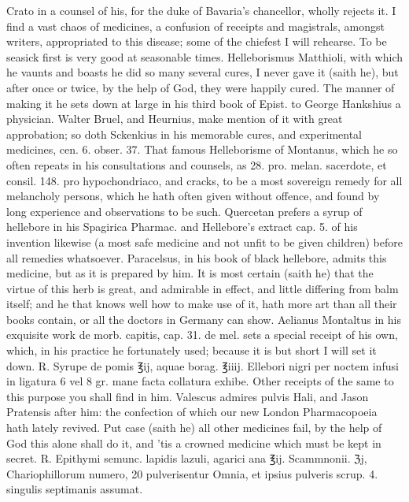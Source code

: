Crato in a counsel of his, for the duke of Bavaria's chancellor, wholly
rejects it.
I find a vast chaos of medicines, a confusion of receipts and
magistrals, amongst writers, appropriated to this disease; some of the
chiefest I will rehearse. To be seasick first is very good at
seasonable times. Helleborismus Matthioli, with which he vaunts and
boasts he did so many several cures, I never gave it (saith he),
but after once or twice, by the help of God, they were happily cured.
The manner of making it he sets down at large in his third book of
Epist. to George Hankshius a physician. Walter Bruel, and Heurnius,
make mention of it with great approbation; so doth Sckenkius in his
memorable cures, and experimental medicines, cen. 6. obser. 37. That
famous Helleborisme of Montanus, which he so often repeats in his
consultations and counsels, as 28. pro. melan. sacerdote, et consil.
148. pro hypochondriaco, and cracks,  to be a most sovereign
remedy for all melancholy persons, which he hath often given without
offence, and found by long experience and observations to be such.
Quercetan prefers a syrup of hellebore in his Spagirica Pharmac. and
Hellebore's extract cap. 5. of his invention likewise (a most safe
medicine and not unfit to be given children) before all remedies
whatsoever. 
Paracelsus, in his book of black hellebore, admits this medicine, but
as it is prepared by him. It is most certain (saith he) that the
virtue of this herb is great, and admirable in effect, and little
differing from balm itself; and he that knows well how to make use of
it, hath more art than all their books contain, or all the doctors in
Germany can show.
Aelianus Montaltus in his exquisite work de morb. capitis, cap. 31. de
mel. sets a special receipt of his own, which, in his practice he
fortunately used; because it is but short I will set it down.
℞. Syrupe de pomis ℥ij, aquae borag. ℥iiij. Ellebori nigri per noctem
infusi in ligatura 6 vel 8 gr. mane facta collatura exhibe.
Other receipts of the same to this purpose you shall find in him.
Valescus admires pulvis Hali, and Jason Pratensis after him: the
confection of which our new London Pharmacopoeia hath lately revived.
Put case (saith he) all other medicines fail, by the help of God
this alone shall do it, and 'tis a crowned medicine which must be kept
in secret.
℞. Epithymi semunc. lapidis lazuli, agarici ana ℥ij. Scammnonii. ℨj,
Chariophillorum numero, 20 pulverisentur Omnia, et ipsius pulveris
scrup. 4. singulis septimanis assumat.

